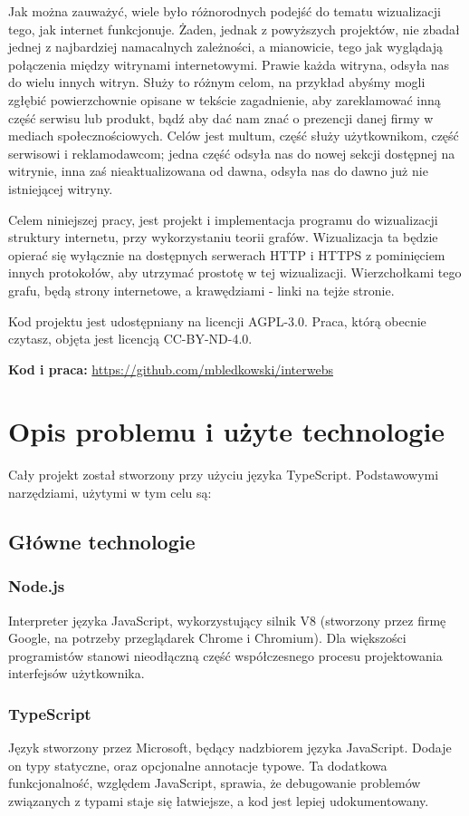\documentclass[a4paper, 12pt]{article}
\begin{document}
Jak można zauważyć, wiele było różnorodnych podejść do tematu wizualizacji tego, jak internet funkcjonuje. Żaden, jednak z powyższych projektów, nie zbadał jednej z najbardziej namacalnych zależności, a mianowicie, tego jak wyglądają połączenia między witrynami internetowymi. Prawie każda witryna, odsyła nas do wielu innych witryn. Służy to różnym celom, na przykład abyśmy mogli zgłębić powierzchownie opisane w tekście zagadnienie, aby zareklamować inną część serwisu lub produkt, bądź aby dać nam znać o prezencji danej firmy w mediach społecznościowych. Celów jest multum, część służy użytkownikom, część serwisowi i reklamodawcom; jedna część odsyła nas do nowej sekcji dostępnej na witrynie, inna zaś nieaktualizowana od dawna, odsyła nas do dawno już nie istniejącej witryny.

Celem niniejszej pracy, jest projekt i implementacja programu do wizualizacji struktury internetu, przy wykorzystaniu teorii grafów. Wizualizacja ta będzie opierać się wyłącznie na dostępnych serwerach HTTP i HTTPS z pominięciem innych protokołów, aby utrzymać prostotę w tej wizualizacji. Wierzchołkami tego grafu, będą strony internetowe, a krawędziami - linki na tejże stronie.

Kod projektu jest udostępniany na licencji AGPL-3.0. Praca, którą obecnie czytasz, objęta jest licencją CC-BY-ND-4.0.

\textbf{Kod i praca:} \url{https://github.com/mbledkowski/interwebs}

\section{Opis problemu i użyte technologie}
Cały projekt został stworzony przy użyciu języka TypeScript. Podstawowymi narzędziami, użytymi w tym celu są:

\subsection{Główne technologie}
\subsubsection{Node.js}
Interpreter języka JavaScript, wykorzystujący silnik V8 (stworzony przez firmę Google, na potrzeby przeglądarek Chrome i Chromium\cite{aboutV8Doc}).\cite{aboutNodejsDoc} Dla większości programistów stanowi nieodłączną część współczesnego procesu projektowania interfejsów użytkownika.
\subsubsection{TypeScript}
Język stworzony przez Microsoft, będący nadzbiorem języka JavaScript. Dodaje on typy statyczne, oraz opcjonalne annotacje typowe.\cite{arstechnicaTypescript} Ta dodatkowa funkcjonalność, względem JavaScript, sprawia, że debugowanie problemów związanych z typami staje się łatwiejsze, a kod jest lepiej udokumentowany.
\end{document}
